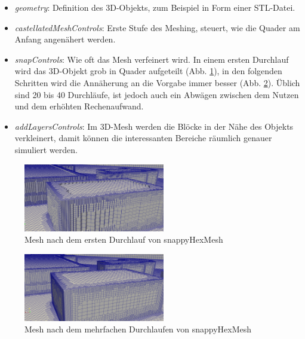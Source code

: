 \begin{itemize}
    \item \textit{geometry}: Definition des 3D-Objekts, zum Beispiel in Form einer STL-Datei.
    \item \textit{castellatedMeshControls}: Erste Stufe des Meshing, steuert, wie die Quader am Anfang angenähert werden.
    \item \textit{snapControls}: Wie oft das Mesh verfeinert wird. 
    In einem ersten Durchlauf wird das 3D-Objekt grob in Quader aufgeteilt (Abb. \ref{fig:snappygrobbild}),
    in den folgenden Schritten wird die Annäherung an die Vorgabe immer besser (Abb. \ref{fig:snappyfeinbild}).
    Üblich sind 20 bis 40 Durchläufe, ist jedoch auch ein Abwägen zwischen dem Nutzen und dem erhöhten Rechenaufwand.
    \item \textit{addLayersControls}: Im 3D-Mesh werden die Blöcke in der Nähe des Objekts verkleinert, 
    damit können die interessanten Bereiche räumlich genauer simuliert werden.
\end{itemize}

\begin{figure}
    \centering
    \includegraphics[width=0.55\textwidth]{papers/openfoam/Bilder/Snappy_grob.png}
    \caption{Mesh nach dem ersten Durchlauf von snappyHexMesh}
    \label{fig:snappygrobbild}
\end{figure}

\begin{figure}
    \centering
    \includegraphics[width=0.55\textwidth]{papers/openfoam/Bilder/Snappy_fein.png}
    \caption{Mesh nach dem mehrfachen Durchlaufen von snappyHexMesh}
    \label{fig:snappyfeinbild}
\end{figure}

